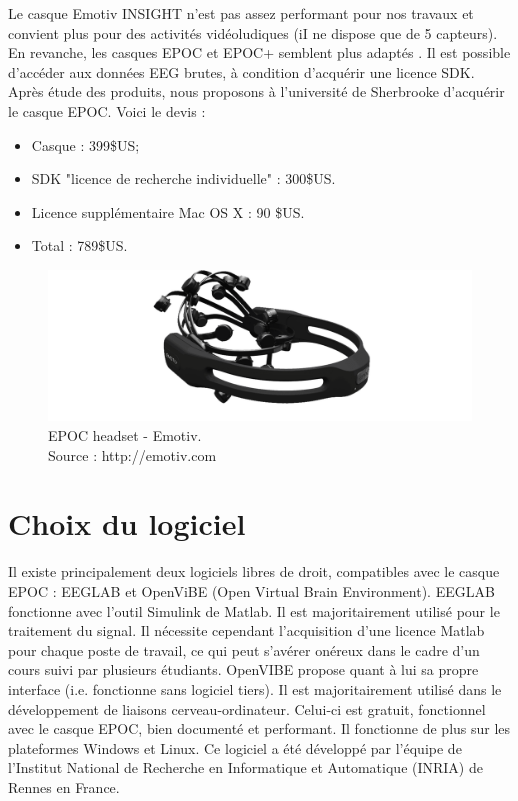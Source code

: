 Le casque Emotiv INSIGHT n'est pas assez performant pour nos travaux et convient plus pour des activités vidéoludiques (iI ne dispose que de 5 capteurs). En revanche, les casques EPOC et EPOC+ semblent plus adaptés \cite{epoc}. Il est possible d'accéder aux données EEG brutes, à condition d'acquérir une licence SDK. 
Après étude des produits, nous proposons à l'université de Sherbrooke d'acquérir le casque EPOC.
 Voici le devis : 
\begin{itemize}
	\smallbreak
	\item Casque : 399\$US;
	\smallbreak
	\item SDK "licence de recherche individuelle" : 300\$US.
	\smallbreak
	\item Licence supplémentaire Mac OS X : 90 \$US.
	\smallbreak
	\item Total : 789\$US.
\end{itemize}

\begin{figure}[h]
	\centering\includegraphics[width=12cm]{images/EPOC.png}
	\caption[EPOC headset - Emotiv]{EPOC headset - Emotiv.\\ Source : http://emotiv.com}
	\label{fig:EPOC}
\end{figure}

\section {Choix du logiciel}
\label{Section:3.Choix du logiciel}
Il existe principalement deux logiciels libres de droit, compatibles avec le casque EPOC : EEGLAB et OpenViBE (Open Virtual Brain Environment).
\smallbreak
EEGLAB fonctionne avec l'outil Simulink de Matlab. Il est majoritairement utilisé pour le traitement du signal. Il nécessite cependant l'acquisition d'une licence Matlab pour chaque poste de travail, ce qui peut s'avérer onéreux dans le cadre d'un cours suivi par plusieurs étudiants.
\smallbreak
OpenVIBE propose quant à lui sa propre interface (i.e. fonctionne sans logiciel tiers). Il est majoritairement utilisé dans le développement de liaisons cerveau-ordinateur. Celui-ci est gratuit, fonctionnel avec le casque EPOC, bien documenté et performant. Il fonctionne de plus sur les plateformes Windows et Linux. Ce logiciel a été développé par l'équipe de l'Institut National de Recherche en Informatique et Automatique (INRIA) de Rennes en France.